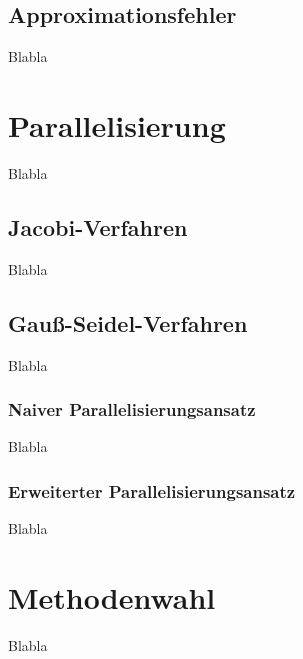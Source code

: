 \documentclass{article}
\begin{document}
\subsection{Approximationsfehler}
Blabla

\section{Parallelisierung}
Blabla
\subsection{Jacobi-Verfahren}
Blabla
\subsection{Gauß-Seidel-Verfahren}
Blabla
\subsubsection{Naiver Parallelisierungsansatz}
Blabla
\subsubsection{Erweiterter Parallelisierungsansatz}
Blabla

\section{Methodenwahl}
Blabla
\end{document}

